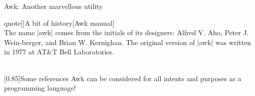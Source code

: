 
\begin{frame}{Awk: Another marvellous utility}
    \begin{varblock}{quote}[\textwidth]{A bit of history}[Awk manual]
        \textnormal{
            \\[1.5ex]
            The name \bash|awk| comes from the initials of its designers: Alfred V. Aho, Peter J. Wein-berger, and Brian W. Kernighan.
            The original version of \bash|awk| was written in \alert{1977} at AT\&T Bell Laboratories.
        }\\[-1ex] ~
    \end{varblock}
    \begin{varblock*}{}[0.85\textwidth]{Some references}
        Awk can be considered for all intents and purposes as a programming language!\\
        $\quad$ \\
        $\quad$
    \end{varblock*}
\end{frame}
